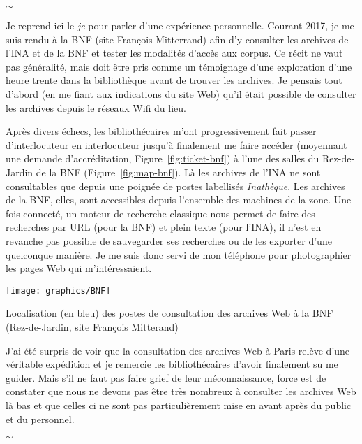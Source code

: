 \documentclass[symmetric,justified,marginals=raggedouter]{tufte-book}
\begin{document}
\begin{center}
	$\sim$
\end{center}

\noindent Je reprend ici le \textit{je} pour parler d'une expérience personnelle. Courant 2017, je me suis rendu à la BNF (site François Mitterrand) afin d'y consulter les archives de l'INA et de la BNF et tester les modalités d'accès aux corpus. Ce récit ne vaut pas généralité, mais doit être pris comme un témoignage d'une exploration d'une heure trente dans la bibliothèque avant de trouver les archives. Je pensais tout d'abord (en me fiant aux indications du site Web) qu'il était possible de consulter les archives depuis le réseaux Wifi du lieu. 

Après divers échecs, les bibliothécaires m'ont progressivement fait passer d'interlocuteur en interlocuteur jusqu'à finalement me faire accéder (moyennant une demande d'accréditation, Figure~\ref{fig:ticket-bnf}) à l'une des salles du Rez-de-Jardin de la BNF (Figure~\ref{fig:map-bnf}). Là les archives de l'INA ne sont consultables que depuis une poignée de postes labellisés \textit{Inathèque}. Les archives de la BNF, elles, sont accessibles depuis l'ensemble des  machines de la zone. Une fois connecté, un moteur de recherche classique nous permet de faire des recherches par URL (pour la BNF) et plein texte (pour l'INA), il n'est en revanche pas possible de sauvegarder ses recherches ou de les exporter d'une quelconque manière. Je me suis donc servi de mon téléphone pour photographier les pages Web qui m'intéressaient.

\begin{marginfigure}%
  \texttt{[image: graphics/BNF]}
  \caption{Localisation (en bleu) des postes de consultation des archives Web à la BNF (Rez-de-Jardin, site François Mitterand)}
  \label{fig:map-bnf}
\end{marginfigure} 

J'ai été surpris de voir que la consultation des archives Web à Paris relève d'une véritable expédition et je remercie les bibliothécaires d'avoir finalement su me guider. Mais s'il ne faut pas faire grief de leur méconnaissance, force est de constater que nous ne devons pas être très nombreux à consulter les archives Web là bas et que celles ci ne sont pas particulièrement mise en avant après du public et du personnel.

\begin{center}
	$\sim$
\end{center}
  
\end{document}
